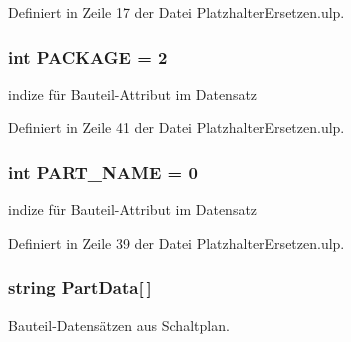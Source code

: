Definiert in Zeile 17 der Datei Platzhalter\+Ersetzen.\+ulp.

\hypertarget{_platzhalter_ersetzen_8ulp_a2d0a92f7c80ad7c1fae87f79bbaa300f}{}
\subsubsection[{P\+A\+C\+K\+A\+G\+E}]{\setlength{\rightskip}{0pt plus 5cm}int P\+A\+C\+K\+A\+G\+E = 2}\label{_platzhalter_ersetzen_8ulp_a2d0a92f7c80ad7c1fae87f79bbaa300f}


indize für Bauteil-\/\+Attribut im Datensatz 



Definiert in Zeile 41 der Datei Platzhalter\+Ersetzen.\+ulp.

\hypertarget{_platzhalter_ersetzen_8ulp_a20b95608e9793b5cac8103d5881fe983}{}
\subsubsection[{P\+A\+R\+T\+\_\+\+N\+A\+M\+E}]{\setlength{\rightskip}{0pt plus 5cm}int P\+A\+R\+T\+\_\+\+N\+A\+M\+E = 0}\label{_platzhalter_ersetzen_8ulp_a20b95608e9793b5cac8103d5881fe983}


indize für Bauteil-\/\+Attribut im Datensatz 



Definiert in Zeile 39 der Datei Platzhalter\+Ersetzen.\+ulp.

\hypertarget{_platzhalter_ersetzen_8ulp_a73ff9d2da91fa45853c1dea18eb324f2}{}
\subsubsection[{Part\+Data}]{\setlength{\rightskip}{0pt plus 5cm}string Part\+Data\mbox{[}$\,$\mbox{]}}\label{_platzhalter_ersetzen_8ulp_a73ff9d2da91fa45853c1dea18eb324f2}


Bauteil-\/\+Datensätzen aus Schaltplan. 



